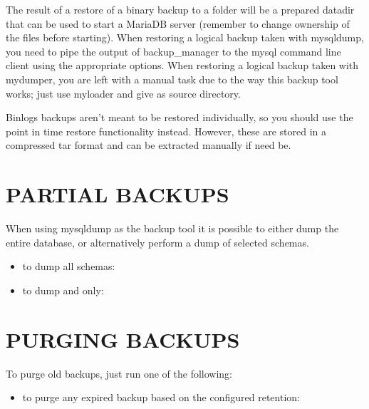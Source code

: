 \documentclass[letterpaper,10pt,english]{sphinxmanual}
\begin{document}
The result of a restore of a binary backup to a folder will be a prepared datadir
that can be used to start a MariaDB server (remember to change ownership of the files
before starting). When restoring a logical backup taken with mysqldump, you need
to pipe the output of backup\_manager to the mysql command line client using the
appropriate options. When restoring a logical backup taken with mydumper, you are
left with a manual task due to the way this backup tool works; just use myloader
and give  as source directory.

Binlogs backups aren’t meant to be restored individually, so you should use the
point in time restore functionality instead. However, these are stored in a compressed
tar format and can be extracted manually if need be.


\section{PARTIAL BACKUPS}
\label{\detokenize{mariadb-backup-manager:partial-backups}}
When using mysqldump as the backup tool it is possible to either dump the entire database, or
alternatively perform a dump of selected schemas.
\begin{itemize}
\item {} 
to dump all schemas:

\end{itemize}

\begin{itemize}
\item {} 
to dump  and  only:

\end{itemize}



\section{PURGING BACKUPS}
\label{\detokenize{mariadb-backup-manager:purging-backups}}
To purge old backups, just run one of the following:
\begin{itemize}
\item {} 
to purge any expired backup based on the configured retention:

\end{itemize}
\end{document}
